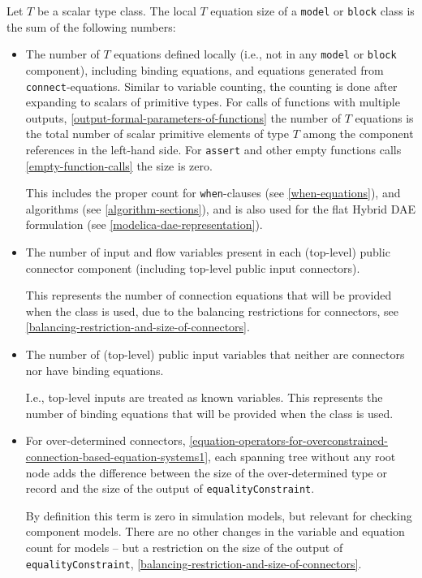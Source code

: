 \begin{definition}\label{local-equation-size}
Let $T$ be a scalar type class.
The local $T$ equation size of a \lstinline!model! or \lstinline!block! class is the sum of the following numbers:
\begin{itemize}
\item
  The number of $T$ equations defined locally (i.e., not in any \lstinline!model! or \lstinline!block! component), including binding equations, and equations generated from \lstinline!connect!-equations.
  Similar to variable counting, the counting is done after expanding to scalars of primitive types.
  For calls of functions with multiple outputs, \cref{output-formal-parameters-of-functions} the number of $T$ equations is the total number of scalar primitive elements of type $T$ among the component references in the left-hand side.
  For \lstinline!assert! and other empty functions calls \cref{empty-function-calls} the size is zero.
  \begin{nonnormative}
  This includes the proper count for \lstinline!when!-clauses (see \cref{when-equations}), and algorithms (see \cref{algorithm-sections}), and is also used for the flat Hybrid DAE formulation (see \cref{modelica-dae-representation}).
  \end{nonnormative}
\item
  The number of input and flow variables present in each (top-level) public connector component (including top-level public input connectors).
  \begin{nonnormative}
  This represents the number of connection equations that will be provided when the class is used, due to the balancing restrictions for connectors, see \cref{balancing-restriction-and-size-of-connectors}.
  \end{nonnormative}
\item
  The number of (top-level) public input variables that neither are connectors nor have binding equations.
  \begin{nonnormative}
  I.e., top-level inputs are treated as known variables.
  This represents the number of binding equations that will be provided when the class is used.
  \end{nonnormative}
\item
  For over-determined connectors, \cref{equation-operators-for-overconstrained-connection-based-equation-systems1}, each spanning tree without any root node adds the difference between the size of the over-determined type or record and the size of the output of \lstinline!equalityConstraint!.
\begin{nonnormative}
  By definition this term is zero in simulation models, but relevant for checking component models.
  There are no other changes in the variable and equation count for models -- but a restriction on the size of the output of \lstinline!equalityConstraint!, \cref{balancing-restriction-and-size-of-connectors}.
\end{nonnormative}
\end{itemize}
\end{definition}

